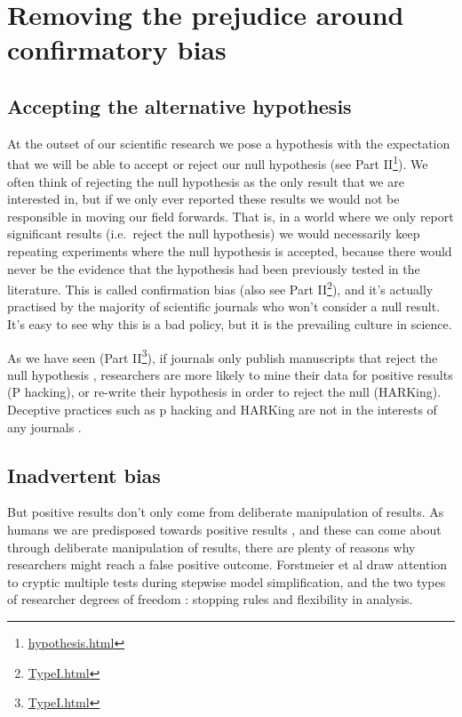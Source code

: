 \documentclass[
]{krantz}
\renewcommand{\href}[2]{#2\footnote{\url{#1}}}
\begin{document}
\hypertarget{removing-the-prejudice-around-confirmatory-bias}{%
\section{Removing the prejudice around confirmatory bias}\label{removing-the-prejudice-around-confirmatory-bias}}

\hypertarget{accepting-the-alternative-hypothesis}{%
\subsection{Accepting the alternative hypothesis}\label{accepting-the-alternative-hypothesis}}

At the outset of our scientific research we pose a hypothesis with the expectation that we will be able to accept or reject our null hypothesis (see \href{hypothesis.html}{Part II}). We often think of rejecting the null hypothesis as the only result that we are interested in, but if we only ever reported these results we would not be responsible in moving our field forwards. That is, in a world where we only report significant results (i.e.~reject the null hypothesis) we would necessarily keep repeating experiments where the null hypothesis is accepted, because there would never be the evidence that the hypothesis had been previously tested in the literature. This is called confirmation bias (also see \href{TypeI.html}{Part II}), and it's actually practised by the majority of scientific journals who won't consider a null result. It's easy to see why this is a bad policy, but it is the prevailing culture in science.

As we have seen (\href{TypeI.html}{Part II}), if journals only publish manuscripts that reject the null hypothesis \citep[cf][]{franco2014publication}, researchers are more likely to mine their data for positive results (P hacking), or re-write their hypothesis in order to reject the null (HARKing). Deceptive practices such as p hacking and HARKing are not in the interests of any journals \citep{forstmeier2017detecting}.

\hypertarget{inadvertent-bias}{%
\subsection{Inadvertent bias}\label{inadvertent-bias}}

But positive results don't only come from deliberate manipulation of results. As humans we are predisposed towards positive results \citep{trivers2011folly}, and these can come about through deliberate manipulation of results, there are plenty of reasons why researchers might reach a false positive outcome. Forstmeier et al \citeyearpar{forstmeier2017detecting} draw attention to cryptic multiple tests during stepwise model simplification, and the two types of researcher degrees of freedom \citep[\emph{sensu}][]{simmons2011false}: stopping rules and flexibility in analysis.
\end{document}
